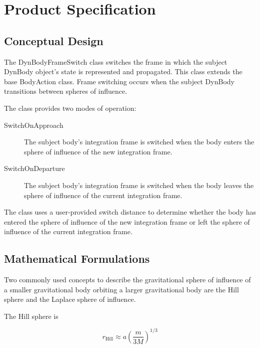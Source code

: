%

\chapter{Product Specification}\label{ch:\modelpartid:spec}

\section{Conceptual Design}
The DynBodyFrameSwitch class switches the frame in which the subject DynBody
object's state is represented and propagated. This class extends the
base BodyAction class. Frame switching occurs when the subject DynBody
transitions between spheres of influence.

The class provides two modes of operation:
\begin{description}
\item[SwitchOnApproach] The subject body's integration frame is switched when
  the body enters the sphere of influence of the new integration frame.
\item[SwitchOnDeparture] The subject body's integration frame is switched when
  the body leaves the sphere of influence of the current integration frame.
\end{description}

The class uses a user-provided switch distance to determine whether the
body has entered the sphere of influence of the new integration frame
or left the sphere of influence of the current integration frame.

\section{Mathematical Formulations}
Two commonly used concepts to describe the gravitational sphere of influence
of a smaller gravitational body orbiting a larger gravitational body are
the Hill sphere\cite{BodyAction:Valtonen} and
the Laplace sphere of influence\cite{BodyAction:Brown}.

The Hill sphere is

\begin{equation}
r_{\text{Hill}} \approx a  \left(\frac{m}{3M}\right)^{1/3}
\end{equation}

